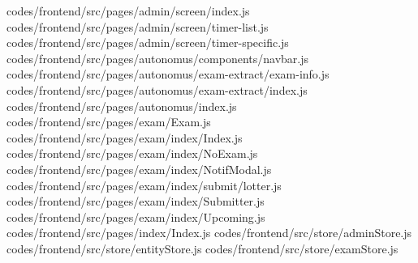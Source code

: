 codes/frontend/src/pages/admin/screen/index.js
codes/frontend/src/pages/admin/screen/timer-list.js
codes/frontend/src/pages/admin/screen/timer-specific.js
codes/frontend/src/pages/autonomus/components/navbar.js
codes/frontend/src/pages/autonomus/exam-extract/exam-info.js
codes/frontend/src/pages/autonomus/exam-extract/index.js
codes/frontend/src/pages/autonomus/index.js
codes/frontend/src/pages/exam/Exam.js
codes/frontend/src/pages/exam/index/Index.js
codes/frontend/src/pages/exam/index/NoExam.js
codes/frontend/src/pages/exam/index/NotifModal.js
codes/frontend/src/pages/exam/index/submit/lotter.js
codes/frontend/src/pages/exam/index/Submitter.js
codes/frontend/src/pages/exam/index/Upcoming.js
codes/frontend/src/pages/index/Index.js
codes/frontend/src/store/adminStore.js
codes/frontend/src/store/entityStore.js
codes/frontend/src/store/examStore.js
